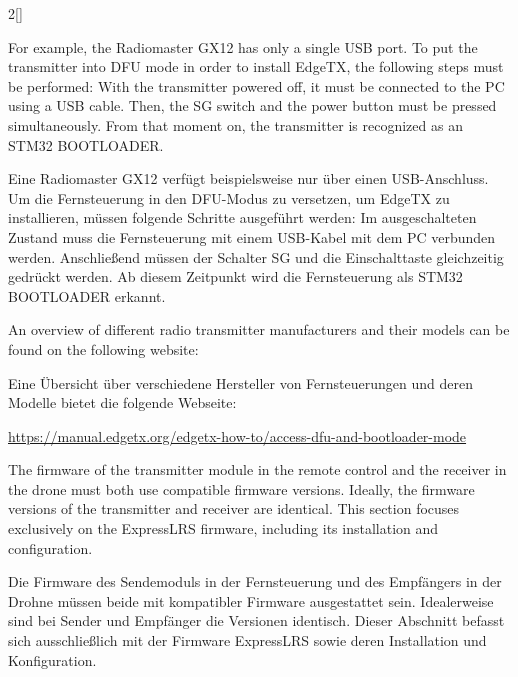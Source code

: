 \begin{paracol}{2}[]
\coleng

For example, the Radiomaster GX12 has only a single USB port. To put the transmitter into DFU mode in order to install EdgeTX, the following steps must be performed: With the transmitter powered off, it must be connected to the PC using a USB cable. Then, the SG switch and the power button must be pressed simultaneously. From that moment on, the transmitter is recognized as an STM32 BOOTLOADER.

\colger

Eine Radiomaster GX12 verfügt beispielsweise nur über einen USB-Anschluss. Um die Fernsteuerung in den DFU-Modus zu versetzen, um EdgeTX zu installieren, müssen folgende Schritte ausgeführt werden: Im ausgeschalteten Zustand muss die Fernsteuerung mit einem USB-Kabel mit dem PC verbunden werden. Anschließend müssen der Schalter SG und die Einschalttaste gleichzeitig gedrückt werden. Ab diesem Zeitpunkt wird die Fernsteuerung als STM32 BOOTLOADER erkannt.

\coleng

An overview of different radio transmitter manufacturers and their models can be found on the following website:

\colger

Eine Übersicht über verschiedene Hersteller von Fernsteuerungen und deren Modelle bietet die folgende Webseite:

\colende

\href{https://manual.edgetx.org/edgetx-how-to/access-dfu-and-bootloader-mode}{https://manual.edgetx.org/edgetx-how-to/access-dfu-and-bootloader-mode}


\renewcommand{\deutschertitel}{Sendemodul- und Empfänger-Firmware: ExpressLRS}
\renewcommand{\englischertitel}{Transmitter and Receiver Firmware: ExpressLRS}
\makroabschnitt
\label{AbschnittExpressLRS}

The firmware of the transmitter module in the remote control and the receiver in the drone must both use compatible firmware versions. Ideally, the firmware versions of the transmitter and receiver are identical. This section focuses exclusively on the ExpressLRS firmware, including its installation and configuration.

\colger

Die Firmware des Sendemoduls in der Fernsteuerung und des Empfängers in der Drohne müssen beide mit kompatibler Firmware ausgestattet sein. Idealerweise sind bei Sender und Empfänger die Versionen identisch. Dieser Abschnitt befasst sich ausschließlich mit der Firmware ExpressLRS sowie deren Installation und Konfiguration.


\end{paracol}
